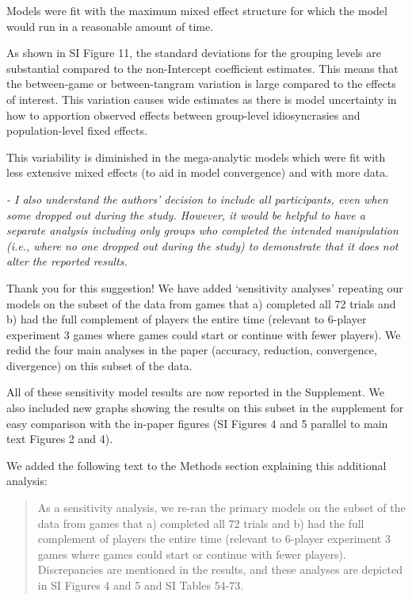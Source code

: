 \documentclass{stanfordletter}
\newcommand{\theysaid}[1]{\begin{leftbar} \noindent 
		\textsl{ #1}\end{leftbar}}
\newcommand{\revised}[1]{\begin{quote}	#1 \end{quote}}
\begin{document}
\begin{letter}{}
{          	Models were fit with the maximum mixed effect structure for which the model would run in a reasonable amount of time. 
          	
          	As shown in SI Figure 11, the standard deviations for the grouping levels are substantial compared to the non-Intercept coefficient estimates. This means that the between-game or between-tangram variation is large compared to the effects of interest. This variation causes wide estimates as there is model uncertainty in how to apportion observed effects between group-level idiosyncrasies and population-level fixed effects.
          	
          	This variability is diminished in the mega-analytic models which were fit with less extensive mixed effects (to aid in model convergence) and with more data. }

          
          

          
          \theysaid{- I also understand the authors' decision to include all participants, even when some dropped out during the study. However, it would be helpful to have a separate analysis including only groups who completed the intended manipulation (i.e., where no one dropped out during the study) to demonstrate that it does not alter the reported results.}
          
          Thank you for this suggestion! We have added `sensitivity analyses' repeating our models on the subset of the data from games that a) completed all 72 trials and b) had the full complement of players the entire time (relevant to 6-player experiment 3 games where games could start or continue with fewer players). We redid the four main analyses in the paper (accuracy, reduction, convergence, divergence) on this subset of the data. 
          
          All of these sensitivity model results are now reported in the Supplement. We also included new graphs showing the results on this subset in the supplement for easy comparison with the in-paper figures (SI Figures 4 and 5 parallel to main text Figures 2 and 4). 
          
          We added the following text to the Methods section explaining this additional analysis:
          

          \revised{As a sensitivity analysis, we re-ran the primary models on the subset of the data from games that a) completed all 72 trials and b) had the full complement of players the entire time (relevant to 6-player experiment 3 games where games could start or continue with fewer players). Discrepancies are mentioned in the results, and these analyses are depicted in SI Figures 4 and 5 and SI Tables 54-73.}
          

\end{letter}
\end{document}
